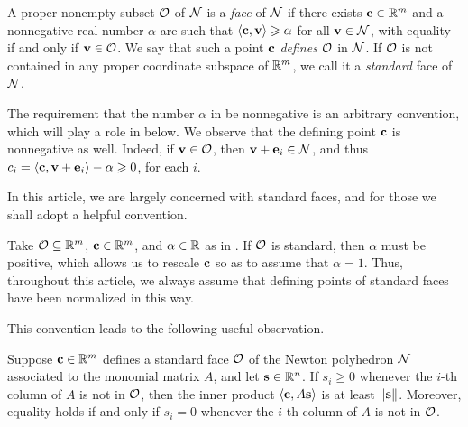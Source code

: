 \documentclass[11pt]{amsart}
\begin{document}
\begin{definition}[Faces]
   \label{defn: face}
   A proper nonempty subset $\mathcal{O}$ of $\mathcal{N}$ is a \emph{face} of $\mathcal{N}$ if there exists $\mathbf{c} \in \mathbb{R}^m$ and a nonnegative real number $\alpha$ are such that $\langle \mathbf{c}, \mathbf{v} \rangle \geqslant \alpha$ for all $\mathbf{v} \in \mathcal{N}$, with equality if and only if $\mathbf{v} \in \mathcal{O}$.
   We say that such a point $\mathbf{c}$ \emph{defines} $\mathcal{O}$ in $\mathcal{N}$.
   If $\mathcal{O}$ is not contained in any proper coordinate subspace of $\mathbb{R}^m$, we call it a \emph{standard} face of $\mathcal{N}$.
\end{definition}

\begin{remark}
   \label{rmk: nonnegativity of defining point}
   The requirement that the number $\alpha$ in  be nonnegative is an arbitrary convention, which will play a role in  below.
   We observe that the defining point $\mathbf{c}$ is nonnegative as well.
   Indeed, if $\mathbf{v} \in \mathcal{O}$, then $\mathbf{v} + \mathbf{e}_i \in \mathcal{N}$, and thus $c_i = \langle \mathbf{c}, \mathbf{v} + \mathbf{e}_i \rangle -\alpha \geqslant 0$, for each $i$.
\end{remark}

In this article, we are largely concerned with standard faces, and for those we shall adopt a helpful convention.

\begin{convention}
\label{alpha=1: convention}
Take $\mathcal{O} \subseteq \mathbb{R}^m$, $\mathbf{c} \in \mathbb{R}^m$, and $\alpha \in \mathbb{R}$ as in .
If $\mathcal{O}$ is standard, then $\alpha$ must be positive, which allows us to rescale $\mathbf{c}$ so as to assume that $\alpha = 1$.
Thus, throughout this article, we always assume that defining points of standard faces have been normalized in this way.
\end{convention}

This convention leads to the following useful observation.

\begin{proposition}\label{prop: inner product with columns of A}
   Suppose $\mathbf{c} \in \mathbb{R}^m$ defines a standard face $\mathcal{O}$ of the Newton polyhedron $\mathcal{N}$ associated to the monomial matrix $A$, and let $\mathbf{s} \in \mathbb{R}^n$.
   If $s_i \ge 0$ whenever the $i$-th column of $A$ is not in $\mathcal{O}$, then the inner product $\langle \mathbf{c}, A\mathbf{s} \rangle$ is at least $\| \mathbf{s} \|$.
   Moreover, equality holds if and only if $s_i = 0$ whenever the $i$-th column of $A$ is not in $\mathcal{O}$.
\end{proposition}
\end{document}
